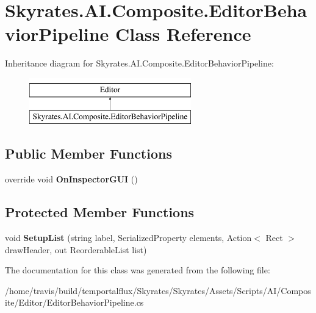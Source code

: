\hypertarget{class_skyrates_1_1_a_i_1_1_composite_1_1_editor_behavior_pipeline}{\section{Skyrates.\-A\-I.\-Composite.\-Editor\-Behavior\-Pipeline Class Reference}
\label{class_skyrates_1_1_a_i_1_1_composite_1_1_editor_behavior_pipeline}
}
Inheritance diagram for Skyrates.\-A\-I.\-Composite.\-Editor\-Behavior\-Pipeline\-:\begin{figure}[H]
\begin{center}
\leavevmode
\includegraphics[height=2.000000cm]{class_skyrates_1_1_a_i_1_1_composite_1_1_editor_behavior_pipeline}
\end{center}
\end{figure}
\subsection*{Public Member Functions}
\begin{DoxyCompactItemize}
\item 
\hypertarget{class_skyrates_1_1_a_i_1_1_composite_1_1_editor_behavior_pipeline_aed2a0dde9eca814be76c04bf9095af7d}{override void {\bfseries On\-Inspector\-G\-U\-I} ()}\label{class_skyrates_1_1_a_i_1_1_composite_1_1_editor_behavior_pipeline_aed2a0dde9eca814be76c04bf9095af7d}

\end{DoxyCompactItemize}
\subsection*{Protected Member Functions}
\begin{DoxyCompactItemize}
\item 
\hypertarget{class_skyrates_1_1_a_i_1_1_composite_1_1_editor_behavior_pipeline_aa3aeb7ce9e4a149496d12e734ed7936e}{void {\bfseries Setup\-List} (string label, Serialized\-Property elements, Action$<$ Rect $>$ draw\-Header, out Reorderable\-List list)}\label{class_skyrates_1_1_a_i_1_1_composite_1_1_editor_behavior_pipeline_aa3aeb7ce9e4a149496d12e734ed7936e}

\end{DoxyCompactItemize}


The documentation for this class was generated from the following file\-:\begin{DoxyCompactItemize}
\item 
/home/travis/build/temportalflux/\-Skyrates/\-Skyrates/\-Assets/\-Scripts/\-A\-I/\-Composite/\-Editor/Editor\-Behavior\-Pipeline.\-cs\end{DoxyCompactItemize}
